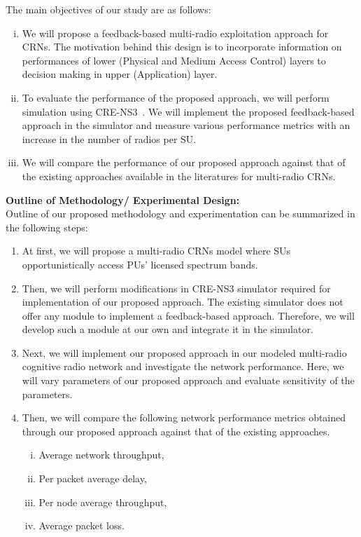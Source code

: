 \documentclass[12pt,addpoints,fleqn]{exam}
\begin{document}
\begin{questions}
The main objectives of our study are as follows:
\begin{enumerate}[i.]
    \item We will propose a feedback-based multi-radio exploitation approach for CRNs. The motivation behind this design is to incorporate information on performances of lower (Physical and Medium Access Control) layers to decision making in upper (Application) layer.
    \item To evaluate the performance of the proposed approach, we will perform simulation using CRE-NS3~\cite{al2014simulating}. We will implement the proposed feedback-based approach in the simulator and measure various performance metrics with an increase in the number of radios per SU.
    \item We will compare the performance of our proposed approach against that of the existing approaches available in the literatures for multi-radio CRNs.
\end{enumerate}
{\bfseries \question
\textbf{Outline of Methodology/ Experimental Design:}}\\
Outline of our proposed methodology and experimentation can be summarized in the following steps:
\begin{enumerate}
    \item At first, we will propose a multi-radio CRNs model where SUs opportunistically access PUs' licensed spectrum bands.
    \item Then, we will perform modifications in CRE-NS3 simulator required for implementation of our proposed approach. The existing simulator does not offer any module to implement a feedback-based approach. Therefore, we will develop such a module at our own and integrate it in the simulator.
    \item Next, we will implement our proposed approach in our modeled multi-radio cognitive radio network and investigate the network performance. Here, we will vary parameters of our proposed approach and evaluate sensitivity of the parameters.
    \item Then, we will compare the following network performance metrics obtained through our proposed approach against that of the existing approaches.
    \begin{enumerate}[i.]
        \item Average network throughput,
        \item Per packet average delay,
        \item Per node average throughput,
        \item Average packet loss.

\end{enumerate}
\end{enumerate}
\end{questions}
\end{document}
